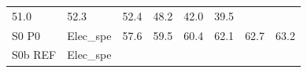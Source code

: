 \documentclass[]{article}
\begin{document}
\begin{longtable}[]{@{}llrrrrrr@{}}
\begin{minipage}[t]{0.09\columnwidth}
51.0\strut
\end{minipage} & \begin{minipage}[t]{0.09\columnwidth}\raggedleft\strut
52.3\strut
\end{minipage} & \begin{minipage}[t]{0.09\columnwidth}\raggedleft\strut
52.4\strut
\end{minipage} & \begin{minipage}[t]{0.09\columnwidth}\raggedleft\strut
48.2\strut
\end{minipage} & \begin{minipage}[t]{0.09\columnwidth}\raggedleft\strut
42.0\strut
\end{minipage} & \begin{minipage}[t]{0.09\columnwidth}\raggedleft\strut
39.5\strut
\end{minipage}\tabularnewline
\begin{minipage}[t]{0.14\columnwidth}\raggedright\strut
S0 P0\strut
\end{minipage} & \begin{minipage}[t]{0.13\columnwidth}\raggedright\strut
Elec\_spe\strut
\end{minipage} & \begin{minipage}[t]{0.09\columnwidth}\raggedleft\strut
57.6\strut
\end{minipage} & \begin{minipage}[t]{0.09\columnwidth}\raggedleft\strut
59.5\strut
\end{minipage} & \begin{minipage}[t]{0.09\columnwidth}\raggedleft\strut
60.4\strut
\end{minipage} & \begin{minipage}[t]{0.09\columnwidth}\raggedleft\strut
62.1\strut
\end{minipage} & \begin{minipage}[t]{0.09\columnwidth}\raggedleft\strut
62.7\strut
\end{minipage} & \begin{minipage}[t]{0.09\columnwidth}\raggedleft\strut
63.2\strut
\end{minipage}\tabularnewline
\begin{minipage}[t]{0.14\columnwidth}\raggedright\strut
S0b REF\strut
\end{minipage} & \begin{minipage}[t]{0.13\columnwidth}\raggedright\strut
Elec\_spe\strut
\end{minipage} & \begin{minipage}[t]{0.09\columnwidth}\raggedleft\strut

\end{minipage}
\end{longtable}
\end{document}
